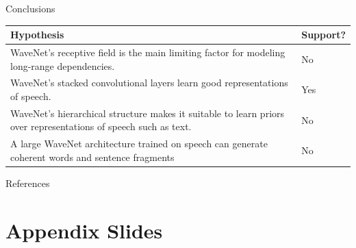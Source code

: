 \documentclass[
  ignorenonframetext,
  aspectratio=169,
]{beamer}
\begin{document}
\begin{frame}{Conclusions}
\begin{longtable}[]{@{}ll@{}}
\toprule
\begin{minipage}[b]{0.83\columnwidth}\raggedright
Hypothesis\strut
\end{minipage} & \begin{minipage}[b]{0.11\columnwidth}\raggedright
Support?\strut
\end{minipage}\tabularnewline
\midrule
\endhead
\begin{minipage}[t]{0.83\columnwidth}\raggedright
WaveNet's receptive field is the main limiting factor for modeling
long-range dependencies.\strut
\end{minipage} & \begin{minipage}[t]{0.11\columnwidth}\raggedright
No\strut
\end{minipage}\tabularnewline
\begin{minipage}[t]{0.83\columnwidth}\raggedright
WaveNet's stacked convolutional layers learn good representations of
speech.\strut
\end{minipage} & \begin{minipage}[t]{0.11\columnwidth}\raggedright
Yes\strut
\end{minipage}\tabularnewline
\begin{minipage}[t]{0.83\columnwidth}\raggedright
WaveNet's hierarchical structure makes it suitable to learn priors over
representations of speech such as text.\strut
\end{minipage} & \begin{minipage}[t]{0.11\columnwidth}\raggedright
No\strut
\end{minipage}\tabularnewline
\begin{minipage}[t]{0.83\columnwidth}\raggedright
A large WaveNet architecture trained on speech can generate coherent
words and sentence fragments\strut
\end{minipage} & \begin{minipage}[t]{0.11\columnwidth}\raggedright
No\strut
\end{minipage}\tabularnewline
\bottomrule
\end{longtable}
\end{frame}

\begin{frame}{References}
\protect\hypertarget{references}{}


\end{frame}

\hypertarget{appendix-slides}{%
\section{Appendix Slides}\label{appendix-slides}}
\end{document}
